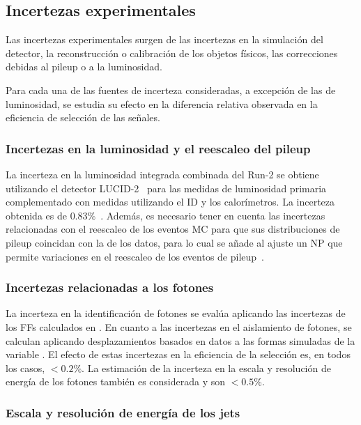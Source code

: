 \subsection{Incertezas experimentales}
\label{subsec:signals:systs:exp}

Las incertezas experimentales surgen de las incertezas en la simulación del detector, la reconstrucción o calibración de los objetos físicos, las correcciones debidas al pileup o a la luminosidad.

Para cada una de las fuentes de incerteza consideradas, a excepción de las de luminosidad, se estudia su efecto en la diferencia relativa observada en la eficiencia de selección de las señales.



\subsubsection{Incertezas en la luminosidad y el reescaleo del pileup}
La incerteza en la luminosidad integrada combinada del Run-2 se obtiene utilizando el detector LUCID-2~\cite{ATLAS-LUCID2} para las medidas de luminosidad primaria complementado con medidas utilizando el \ac{ID} y los calorímetros. La incerteza obtenida es de \(0.83\%\)~\cite{ATLAS-Lumi-Run2}.
Además, es necesario tener en cuenta las incertezas relacionadas con el reescaleo de los eventos \ac{MC} para que sus distribuciones de pileup coincidan con la de los datos, para lo cual se añade al ajuste un \ac{NP} que permite variaciones en el reescaleo de los eventos de pileup~\cite{ATLAS-PileupRW}.


\subsubsection{Incertezas relacionadas a los fotones}
La incerteza en la identificación de fotones se evalúa aplicando las incertezas de los \acp{FF} calculados en \Ch{\ref{ch:ss_corrections}}.
En cuanto a las incertezas en el aislamiento de fotones, se calculan aplicando desplazamientos basados en datos a las formas simuladas de la variable \etiso. El efecto de estas incertezas en la eficiencia de la selección es, en todos los casos, \(<0.2\%\).
La estimación de la incerteza en la escala y resolución de energía de los fotones también es considerada y son \(<0.5\%\).


\subsubsection{Escala y resolución de energía de los jets}

